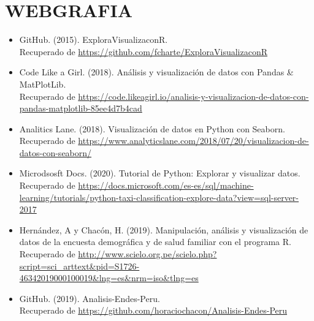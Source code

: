 \documentclass[12pt,letterpaper]{article}
\begin{document}
    \section{WEBGRAFIA}
    \begin{itemize}
        \item GitHub. (2015). ExploraVisualizaconR.\\
        Recuperado de \textcolor{azul}{\url{https://github.com/fcharte/ExploraVisualizaconR}}
        \item Code Like a Girl. (2018). Análisis y visualización de datos con Pandas \& MatPlotLib.\\
        Recuperado de \textcolor{azul}{\url{https://code.likeagirl.io/analisis-y-visualizacion-de-datos-con-pandas-matplotlib-85ee4d7b4cad}}
        \item Analitics Lane. (2018). Visualización de datos en Python con Seaborn.\\
        Recuperado de \textcolor{azul}{\url{https://www.analyticslane.com/2018/07/20/visualizacion-de-datos-con-seaborn/}}
        \item Microdsosft Docs. (2020). Tutorial de Python: Explorar y visualizar datos.\\
        Recuperado de \textcolor{azul}{\url{https://docs.microsoft.com/es-es/sql/machine-learning/tutorials/python-taxi-classification-explore-data?view=sql-server-2017}}
        \item Hernández, A y Chacón, H. (2019). Manipulación, análisis y visualización de datos de la encuesta demográfica y de salud familiar con el programa R.\\
        Recuperado de \textcolor{azul}{\url{http://www.scielo.org.pe/scielo.php?script=sci_arttext&pid=S1726-46342019000100019&lng=es&nrm=iso&tlng=es}}
        \item GitHub. (2019). Analisis-Endes-Peru.\\
        Recuperado de \textcolor{azul}{\url{https://github.com/horaciochacon/Analisis-Endes-Peru}}
    \end{itemize}
\end{document}
